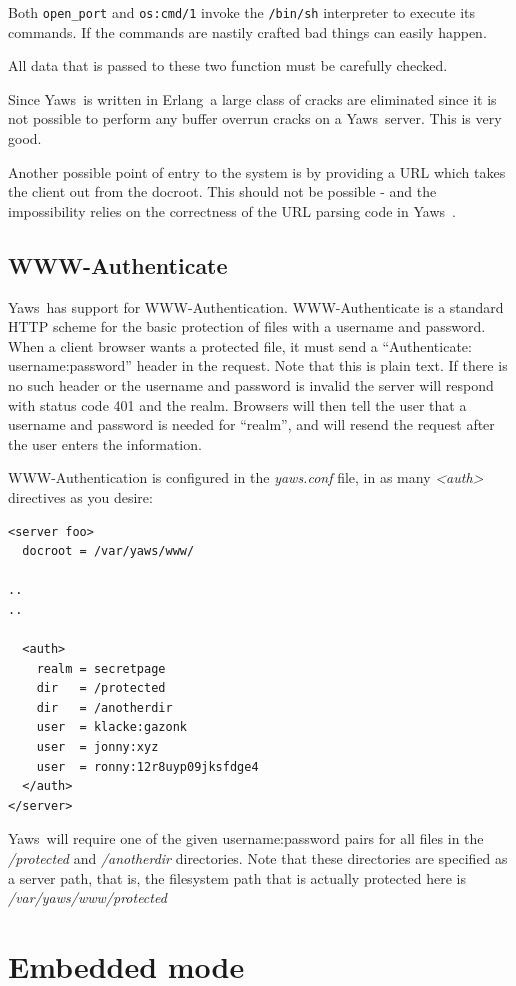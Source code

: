 \documentclass[11pt,oneside,english]{book}
\newcommand{\Erlang}            %
        {{\sc Erlang}}
\newcommand{\Yaws}            %
        {{\sc Yaws}}
\begin{document}
Both \verb+open_port+ and \verb+os:cmd/1+ invoke the \verb+/bin/sh+
interpreter to execute its commands. If the commands are nastily
crafted bad things can easily happen.

All data that is passed to these two function must be carefully
checked.

Since \Yaws\  is written in \Erlang\  a large class of cracks are
eliminated since it is not possible to perform any buffer overrun
cracks on a \Yaws\  server. This is very good.


Another possible point of entry to the system is by providing a URL
which takes the client out from the docroot. This should not be
possible - and the impossibility relies on the correctness of the URL
parsing code in \Yaws\ .

\section{WWW-Authenticate}
\Yaws\  has support for WWW-Authentication.   WWW-Authenticate is a
standard HTTP scheme for the basic protection of files with a username
and password.  When a client browser wants a protected file, it must send a
``Authenticate: username:password'' header in the request.  Note that
this is plain text.   If there is no such header or the username and
password is invalid the server will respond with status code 401 and
the realm.  Browsers will then tell the user that a username and
password is needed for ``realm'',  and will resend the request after
the user enters the information.

WWW-Authentication is configured in the \textit{yaws.conf} file, in as
many \textit{<auth>} directives as you desire:

\begin{verbatim}
<server foo>
  docroot = /var/yaws/www/

..
..

  <auth>
    realm = secretpage
    dir   = /protected
    dir   = /anotherdir
    user  = klacke:gazonk
    user  = jonny:xyz
    user  = ronny:12r8uyp09jksfdge4
  </auth>
</server>
\end{verbatim}


\Yaws\  will require one of the given username:password pairs for all
files in the \textit{/protected} and \textit{/anotherdir} directories.
Note that these directories are specified as a server path,  that is,
the filesystem path that is actually protected here is
\textit{/var/yaws/www/protected}


\chapter {Embedded mode}
\end{document}
